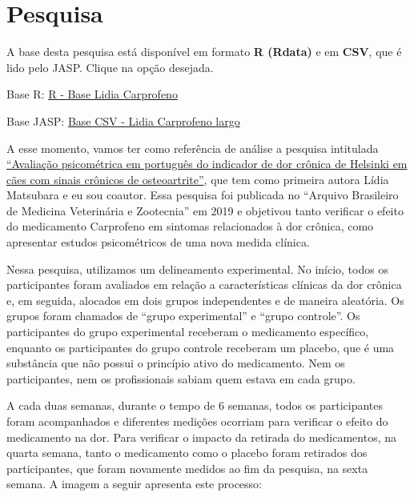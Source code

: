 \documentclass[
]{book}
\begin{document}
\hypertarget{pesquisa-5}{%
\section{Pesquisa}\label{pesquisa-5}}

\begin{base}

A base desta pesquisa está disponível em formato \textbf{R (Rdata)} e em \textbf{CSV}, que é lido pelo JASP. Clique na opção desejada.

Base R: \href{https://github.com/anovabr/mqt/raw/master/bases/R\%20-\%20Base\%20Lidia\%20Carprofeno.RData}{R - Base Lidia Carprofeno}

Base JASP: \href{https://github.com/anovabr/mqt/raw/master/bases/bases_csv_jasp.zip}{Base CSV - Lidia Carprofeno largo}

\end{base}

A esse momento, vamos ter como referência de análise a pesquisa intitulada \href{https://www.scielo.br/scielo.php?script=sci_arttext\&pid=S0102-09352019000100109}{``Avaliação psicométrica em português do indicador de dor crônica de Helsinki em cães com sinais crônicos de osteoartrite''}, que tem como primeira autora Lídia Matsubara e eu sou coautor. Essa pesquisa foi publicada no ``Arquivo Brasileiro de Medicina Veterinária e Zootecnia'' em 2019 e objetivou tanto verificar o efeito do medicamento Carprofeno em sintomas relacionados à dor crônica, como apresentar estudos psicométricos de uma nova medida clínica.

Nessa pesquisa, utilizamos um delineamento experimental. No início, todos os participantes foram avaliados em relação a características clínicas da dor crônica e, em seguida, alocados em dois grupos independentes e de maneira aleatória. Os grupos foram chamados de ``grupo experimental'' e ``grupo controle''. Os participantes do grupo experimental receberam o medicamento específico, enquanto os participantes do grupo controle receberam um placebo, que é uma substância que não possui o princípio ativo do medicamento. Nem os participantes, nem os profissionais sabiam quem estava em cada grupo.

A cada duas semanas, durante o tempo de 6 semanas, todos os participantes foram acompanhados e diferentes medições ocorriam para verificar o efeito do medicamento na dor. Para verificar o impacto da retirada do medicamentos, na quarta semana, tanto o medicamento como o placebo foram retirados dos participantes, que foram novamente medidos ao fim da pesquisa, na sexta semana. A imagem a seguir apresenta este processo:
\end{document}
